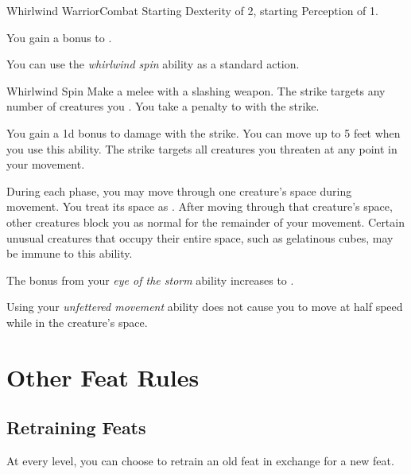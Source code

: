     \begin{feat}{Whirlwind Warrior}{Combat}
        \featpres Starting Dexterity of 2, starting Perception of 1.

         You gain a  bonus to .

         You can use the \textit{whirlwind spin} ability as a standard action.
        \begin{freeability}{Whirlwind Spin}
            Make a melee  with a slashing weapon.
            The strike targets any number of creatures you .
            You take a  penalty to  with the strike.

            \rankline
             You gain a \plus1d bonus to damage with the strike.
             You can move up to 5 feet when you use this ability.
            The strike targets all creatures you threaten at any point in your movement.
        \end{freeability}

         During each phase, you may move through one creature's space during movement.
        You treat its space as .
        After moving through that creature's space, other creatures block you as normal for the remainder of your movement.
        Certain unusual creatures that occupy their entire space, such as gelatinous cubes, may be immune to this ability.


         The bonus from your \textit{eye of the storm} ability increases to .


         Using your \textit{unfettered movement} ability does not cause you to move at half speed while in the creature's space.
    \end{feat}

\section{Other Feat Rules}

    \subsection{Retraining Feats}
        At every level, you can choose to retrain an old feat in exchange for a new feat.
